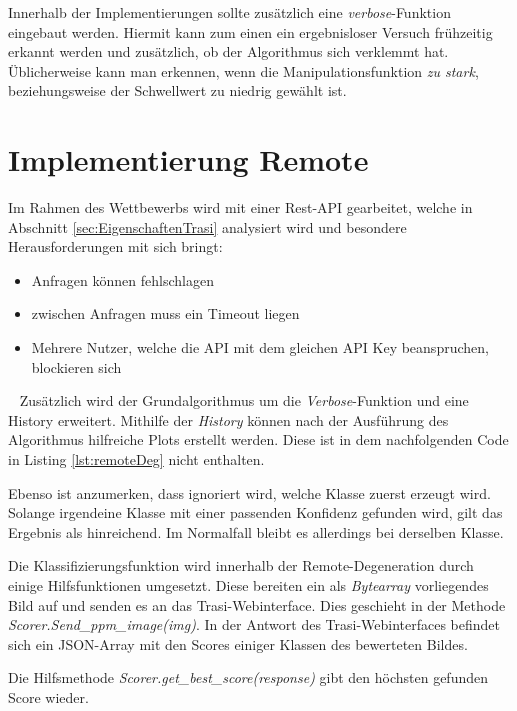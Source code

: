 Innerhalb der Implementierungen sollte zusätzlich eine \textit{verbose}-Funktion eingebaut werden. Hiermit kann zum einen ein ergebnisloser Versuch frühzeitig erkannt werden und zusätzlich, ob der Algorithmus sich verklemmt hat. Üblicherweise kann man erkennen, wenn die Manipulationsfunktion \textit{zu stark}, beziehungsweise der Schwellwert zu niedrig gewählt ist.

\section{Implementierung Remote}
\label{sec:DegenerationRemote}
Im Rahmen des Wettbewerbs wird mit einer Rest-API gearbeitet, welche in Abschnitt \ref{sec:EigenschaftenTrasi} analysiert wird und besondere Herausforderungen mit sich bringt: 

\begin{itemize}
	\item Anfragen können fehlschlagen
	\item zwischen Anfragen muss ein Timeout liegen
	\item Mehrere Nutzer, welche die API mit dem gleichen API Key beanspruchen, blockieren sich
\end{itemize}
~\newline
Zusätzlich wird der Grundalgorithmus um die \textit{Verbose}-Funktion und eine History erweitert. Mithilfe der \textit{History} können nach der Ausführung des Algorithmus hilfreiche Plots erstellt werden. Diese ist in dem nachfolgenden Code in Listing \ref{lst:remoteDeg} nicht enthalten.
 
Ebenso ist anzumerken, dass ignoriert wird, welche Klasse zuerst erzeugt wird. Solange irgendeine Klasse mit einer passenden Konfidenz gefunden wird, gilt das Ergebnis als hinreichend. Im Normalfall bleibt es allerdings bei derselben Klasse. 

Die Klassifizierungsfunktion wird innerhalb der Remote-Degeneration durch einige Hilfsfunktionen umgesetzt. Diese bereiten ein als \textit{Bytearray} vorliegendes Bild auf und senden es an das Trasi-Webinterface. Dies geschieht in der Methode \textit{Scorer.Send\_ppm\_image(img)}. In der Antwort des Trasi-Webinterfaces befindet sich ein JSON-Array mit den Scores einiger Klassen des bewerteten Bildes. 

Die Hilfsmethode \textit{Scorer.get\_best\_score(response)} gibt den höchsten gefunden Score wieder.
\newpage
\begin{scriptsize}
\end{scriptsize}
\newpage
